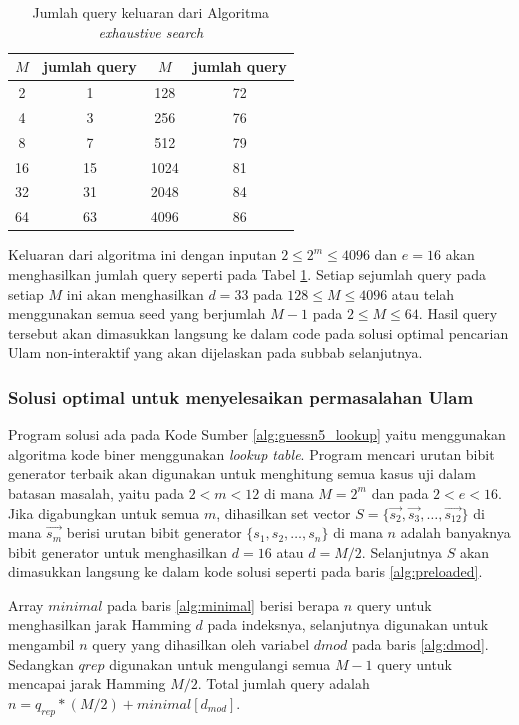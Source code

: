 \begin{table}[h!]
\caption{Jumlah query keluaran dari Algoritma \textit{exhaustive search}}
\label{tab:query_count}
\begin{center}
\begin{tabular}{|c|c|c|c|}
\hline
$M$ & jumlah query & $M$ & jumlah query \\
\hline
2 & 1 & 128 & 72 \\
\hline
4 & 3 & 256 & 76 \\
\hline
8 & 7 & 512 & 79 \\
\hline
16 & 15 & 1024 & 81 \\
\hline
32 & 31 & 2048 & 84 \\
\hline
64 & 63 & 4096 & 86 \\
\hline
\end{tabular}
\end{center}
\end{table}

Keluaran dari algoritma ini dengan inputan $2 \leq 2^m \leq 4096$ dan $e=16$ akan menghasilkan jumlah query seperti pada Tabel \ref{tab:query_count}. Setiap sejumlah query pada setiap $M$ ini akan menghasilkan $d = 33$ pada $128 \leq M \leq 4096$ atau telah menggunakan semua seed yang berjumlah $M-1$ pada $2 \leq M \leq 64$. Hasil query tersebut akan dimasukkan langsung ke dalam code pada solusi optimal pencarian Ulam non-interaktif yang akan dijelaskan pada subbab selanjutnya.

\subsubsection{Solusi optimal untuk menyelesaikan permasalahan Ulam}

Program solusi ada pada Kode Sumber \ref{alg:guessn5_lookup} yaitu menggunakan algoritma kode biner menggunakan \textit{lookup table}. Program mencari urutan bibit generator terbaik akan digunakan untuk menghitung semua kasus uji dalam batasan masalah, yaitu pada $2 < m < 12$ di mana $M = 2^m$ dan pada $2 < e < 16$. Jika digabungkan untuk semua $m$, dihasilkan set vector $S = \{\vec{s_2}, \vec{s_3}, \ldots, \vec{s_12}\}$ di mana $\vec{s_m}$ berisi urutan bibit generator $\{s_1, s_2, \ldots, s_n\}$ di mana $n$ adalah banyaknya bibit generator untuk menghasilkan $d=16$ atau $d=M/2$. Selanjutnya $S$ akan dimasukkan langsung ke dalam kode solusi seperti pada baris \ref{alg:preloaded}.

Array $minimal$ pada baris \ref{alg:minimal} berisi berapa $n$ query untuk menghasilkan jarak Hamming $d$ pada indeksnya, selanjutnya digunakan untuk mengambil $n$ query yang dihasilkan oleh variabel $dmod$ pada baris \ref{alg:dmod}. Sedangkan $qrep$ digunakan untuk mengulangi semua $M-1$ query untuk mencapai jarak Hamming $M/2$. Total jumlah query adalah $n = q_{rep} * (M/2) + minimal[d_{mod}]$.

